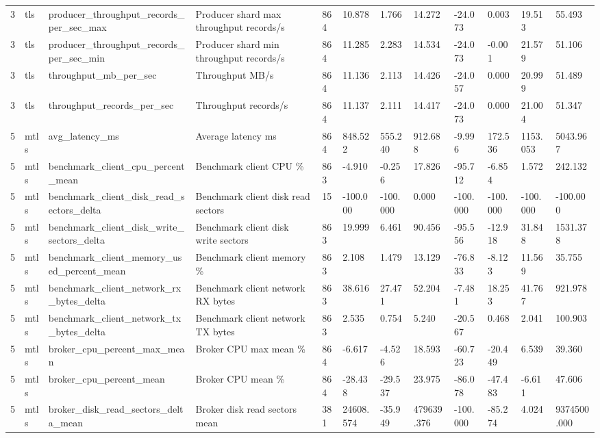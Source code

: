 \begin{longtable}{llllllllllll}
3 & tls & producer\_throughput\_records\_per\_sec\_max & Producer shard max throughput records/s & 864 & 10.878 & 1.766 & 14.272 & -24.073 & 0.003 & 19.513 & 55.493 \\
3 & tls & producer\_throughput\_records\_per\_sec\_min & Producer shard min throughput records/s & 864 & 11.285 & 2.283 & 14.534 & -24.073 & -0.001 & 21.579 & 51.106 \\
3 & tls & throughput\_mb\_per\_sec & Throughput MB/s & 864 & 11.136 & 2.113 & 14.426 & -24.057 & 0.000 & 20.999 & 51.489 \\
3 & tls & throughput\_records\_per\_sec & Throughput records/s & 864 & 11.137 & 2.111 & 14.417 & -24.073 & 0.000 & 21.004 & 51.347 \\
5 & mtls & avg\_latency\_ms & Average latency ms & 864 & 848.522 & 555.240 & 912.688 & -9.996 & 172.536 & 1153.053 & 5043.967 \\
5 & mtls & benchmark\_client\_cpu\_percent\_mean & Benchmark client CPU \% & 863 & -4.910 & -0.256 & 17.826 & -95.712 & -6.854 & 1.572 & 242.132 \\
5 & mtls & benchmark\_client\_disk\_read\_sectors\_delta & Benchmark client disk read sectors & 15 & -100.000 & -100.000 & 0.000 & -100.000 & -100.000 & -100.000 & -100.000 \\
5 & mtls & benchmark\_client\_disk\_write\_sectors\_delta & Benchmark client disk write sectors & 863 & 19.999 & 6.461 & 90.456 & -95.556 & -12.918 & 31.848 & 1531.378 \\
5 & mtls & benchmark\_client\_memory\_used\_percent\_mean & Benchmark client memory \% & 863 & 2.108 & 1.479 & 13.129 & -76.833 & -8.123 & 11.569 & 35.755 \\
5 & mtls & benchmark\_client\_network\_rx\_bytes\_delta & Benchmark client network RX bytes & 863 & 38.616 & 27.471 & 52.204 & -7.481 & 18.253 & 41.767 & 921.978 \\
5 & mtls & benchmark\_client\_network\_tx\_bytes\_delta & Benchmark client network TX bytes & 863 & 2.535 & 0.754 & 5.240 & -20.567 & 0.468 & 2.041 & 100.903 \\
5 & mtls & broker\_cpu\_percent\_max\_mean & Broker CPU max mean \% & 864 & -6.617 & -4.526 & 18.593 & -60.723 & -20.449 & 6.539 & 39.360 \\
5 & mtls & broker\_cpu\_percent\_mean & Broker CPU mean \% & 864 & -28.438 & -29.537 & 23.975 & -86.078 & -47.483 & -6.611 & 47.606 \\
5 & mtls & broker\_disk\_read\_sectors\_delta\_mean & Broker disk read sectors mean & 381 & 24608.574 & -35.949 & 479639.376 & -100.000 & -85.274 & 4.024 & 9374500.000 \\

\end{longtable}

